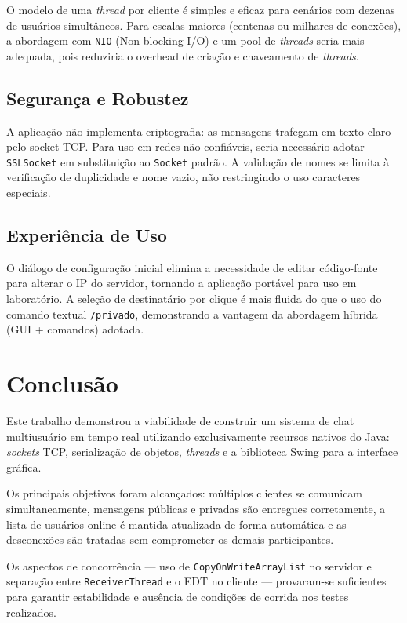 \documentclass[10pt,twocolumn,a4paper]{article}
\begin{document}
O modelo de uma \textit{thread} por cliente é simples e eficaz para cenários
com dezenas de usuários simultâneos. Para escalas maiores (centenas ou
milhares de conexões), a abordagem com \texttt{NIO} (Non-blocking I/O) e um
pool de \textit{threads} seria mais adequada, pois reduziria o overhead de
criação e chaveamento de \textit{threads}.

\subsection{Segurança e Robustez}

A aplicação não implementa criptografia: as mensagens trafegam em texto claro
pelo socket TCP. Para uso em redes não confiáveis, seria necessário adotar
\texttt{SSLSocket} em substituição ao \texttt{Socket} padrão. A validação de
nomes se limita à verificação de duplicidade e nome vazio, não restringindo o uso
caracteres especiais.

\subsection{Experiência de Uso}

O diálogo de configuração inicial elimina a necessidade de editar código-fonte
para alterar o IP do servidor, tornando a aplicação portável para uso em
laboratório. A seleção de destinatário por clique é mais fluida do que o
uso do comando textual \texttt{/privado}, demonstrando a vantagem da abordagem
híbrida (GUI + comandos) adotada.


\section{Conclusão}

Este trabalho demonstrou a viabilidade de construir um sistema de chat
multiusuário em tempo real utilizando exclusivamente recursos nativos do Java:
\textit{sockets} TCP, serialização de objetos, \textit{threads} e a biblioteca
Swing para a interface gráfica.

Os principais objetivos foram alcançados: múltiplos clientes se comunicam
simultaneamente, mensagens públicas e privadas são entregues corretamente, a
lista de usuários online é mantida atualizada de forma automática e as
desconexões são tratadas sem comprometer os demais participantes.

Os aspectos de concorrência — uso de \texttt{CopyOnWriteArrayList} no servidor
e separação entre \texttt{ReceiverThread} e o EDT no cliente — provaram-se
suficientes para garantir estabilidade e ausência de condições de corrida nos
testes realizados.
\end{document}
